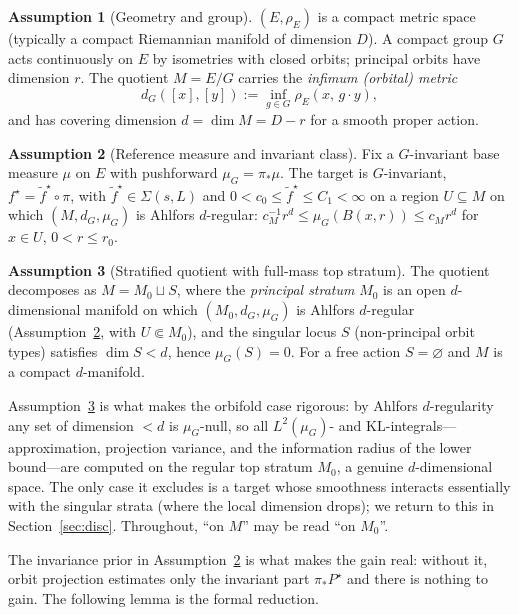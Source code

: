 \documentclass[11pt]{article}
\theoremstyle{plain}
\theoremstyle{definition}
\newtheorem{assumption}{Assumption}
\theoremstyle{remark}
\newcommand{\KL}{\mathrm{KL}}
\DeclareMathOperator{\dimm}{dim}
\begin{document}
\begin{assumption}[Geometry and group]\label{ass:geo}
$(E,\rho_E)$ is a compact metric space (typically a compact Riemannian manifold of
dimension $D$). A compact group $G$ acts continuously on $E$ by isometries with
closed orbits; principal orbits have dimension $r$. The quotient $M=E/G$ carries
the \emph{infimum (orbital) metric}
\[
d_G([x],[y]):=\inf_{g\in G}\rho_E(x,\,g\cdot y),
\]
and has covering dimension $d=\dimm M=D-r$ for a smooth proper action.
\end{assumption}

\begin{assumption}[Reference measure and invariant class]\label{ass:class}
Fix a $G$-invariant base measure $\mu$ on $E$ with pushforward $\mu_G=\pi_*\mu$.
The target is $G$-invariant, $f^\star=\tilde f^\star\circ\pi$, with
$\tilde f^\star\in\Sigma(s,L)$ and $0<c_0\le\tilde f^\star\le C_1<\infty$ on a
region $U\subseteq M$ on which $(M,d_G,\mu_G)$ is Ahlfors $d$-regular:
$c_M^{-1}r^d\le\mu_G(B(x,r))\le c_M r^d$ for $x\in U$, $0<r\le r_0$.
\end{assumption}

\begin{assumption}[Stratified quotient with full-mass top stratum]\label{ass:strata}
The quotient decomposes as $M=M_0\sqcup S$, where the \emph{principal stratum}
$M_0$ is an open $d$-dimensional manifold on which $(M_0,d_G,\mu_G)$ is Ahlfors
$d$-regular (Assumption~\ref{ass:class}, with $U\Subset M_0$), and the singular
locus $S$ (non-principal orbit types) satisfies $\dimm S<d$, hence $\mu_G(S)=0$.
For a free action $S=\varnothing$ and $M$ is a compact $d$-manifold.
\end{assumption}

Assumption~\ref{ass:strata} is what makes the orbifold case rigorous: by
Ahlfors $d$-regularity any set of dimension $<d$ is $\mu_G$-null, so all
$L^2(\mu_G)$- and $\KL$-integrals---approximation, projection variance, and the
information radius of the lower bound---are computed on the regular top stratum
$M_0$, a genuine $d$-dimensional space. The only case it excludes is a target
whose smoothness interacts essentially with the singular strata (where the local
dimension drops); we return to this in Section~\ref{sec:disc}. Throughout,
``on $M$'' may be read ``on $M_0$''.

The invariance prior in Assumption~\ref{ass:class} is what makes the gain real:
without it, orbit projection estimates only the invariant part $\pi_*P^\star$ and
there is nothing to gain. The following lemma is the formal reduction.
\end{document}
